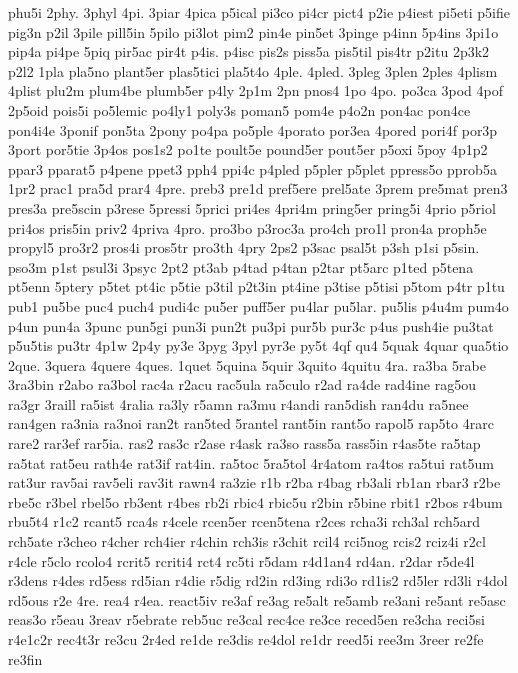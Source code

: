 {phu5i
2phy.
3phyl
4pi.
3piar
4pica
p5ical
pi3co
pi4cr
pict4
p2ie
p4iest
pi5eti
p5ifie
pig3n
p2il
3pile
pill5in
5pilo
pi3lot
pim2
pin4e
pin5et
3pinge
p4inn
5p4ins
3pi1o
pip4a
pi4pe
5piq
pir5ac
pir4t
p4is.
p4isc
pis2s
piss5a
pis5til
pis4tr
p2itu
2p3k2
p2l2
1pla
pla5no
plant5er
plas5tici
pla5t4o
4ple.
4pled.
3pleg
3plen
2ples
4plism
4plist
plu2m
plum4be
plumb5er
p4ly
2p1m
2pn
pnos4
1po
4po.
po3ca
3pod
4pof
2p5oid
pois5i
po5lemic
po4ly1
poly3s
poman5
pom4e
p4o2n
pon4ac
pon4ce
pon4i4e
3ponif
pon5ta
2pony
po4pa
po5ple
4porato
por3ea
4pored
pori4f
por3p
3port
por5tie
3p4os
pos1s2
po1te
poult5e
pound5er
pout5er
p5oxi
5poy
4p1p2
ppar3
pparat5
p4pene
ppet3
pph4
ppi4c
p4pled
p5pler
p5plet
ppress5o
pprob5a
1pr2
prac1
pra5d
prar4
4pre.
preb3
pre1d
pref5ere
prel5ate
3prem
pre5mat
pren3
pres3a
pre5scin
p3rese
5pressi
5prici
pri4es
4pri4m
pring5er
pring5i
4prio
p5riol
pri4os
pris5in
priv2
4priva
4pro.
pro3bo
p3roc3a
pro4ch
pro1l
pron4a
proph5e
propyl5
pro3r2
pros4i
pros5tr
pro3th
4pry
2ps2
p3sac
psal5t
p3sh
p1si
p5sin.
pso3m
p1st
psul3i
3psyc
2pt2
pt3ab
p4tad
p4tan
p2tar
pt5arc
p1ted
p5tena
pt5enn
5ptery
p5tet
pt4ic
p5tie
p3til
p2t3in
pt4ine
p3tise
p5tisi
p5tom
p4tr
p1tu
pub1
pu5be
puc4
puch4
pudi4c
pu5er
puff5er
pu4lar
pu5lar.
pu5lis
p4u4m
pum4o
p4un
pun4a
3punc
pun5gi
pun3i
pun2t
pu3pi
pur5b
pur3c
p4us
push4ie
pu3tat
p5u5tis
pu3tr
4p1w
2p4y
py3e
3pyg
3pyl
pyr3e
py5t
4qf
qu4
5quak
4quar
qua5tio
2que.
3quera
4quere
4ques.
1quet
5quina
5quir
3quito
4quitu
4ra.
ra3ba
5rabe
3ra3bin
r2abo
ra3bol
rac4a
r2acu
rac5ula
ra5culo
r2ad
ra4de
rad4ine
rag5ou
ra3gr
3raill
ra5ist
4ralia
ra3ly
r5amn
ra3mu
r4andi
ran5dish
ran4du
ra5nee
ran4gen
ra3nia
ra3noi
ran2t
ran5ted
5rantel
rant5in
rant5o
rapol5
rap5to
4rarc
rare2
rar3ef
rar5ia.
ras2
ras3c
r2ase
r4ask
ra3so
rass5a
rass5in
r4as5te
ra5tap
ra5tat
rat5eu
rath4e
rat3if
rat4in.
ra5toc
5ra5tol
4r4atom
ra4tos
ra5tui
rat5um
rat3ur
rav5ai
rav5eli
rav3it
rawn4
ra3zie
r1b
r2ba
r4bag
rb3ali
rb1an
rbar3
r2be
rbe5c
r3bel
rbel5o
rb3ent
r4bes
rb2i
rbic4
rbic5u
r2bin
r5bine
rbit1
r2bos
r4bum
rbu5t4
r1c2
rcant5
rca4s
r4cele
rcen5er
rcen5tena
r2ces
rcha3i
rch3al
rch5ard
rch5ate
r3cheo
r4cher
rch4ier
r4chin
rch3is
r3chit
rcil4
rci5nog
rcis2
rciz4i
r2cl
r4cle
r5clo
rcolo4
rcrit5
rcriti4
rct4
rc5ti
r5dam
r4d1an4
rd4an.
r2dar
r5de4l
r3dens
r4des
rd5ess
rd5ian
r4die
r5dig
rd2in
rd3ing
rdi3o
rd1is2
rd5ler
rd3li
r4dol
rd5ous
r2e
4re.
rea4
r4ea.
react5iv
re3af
re3ag
re5alt
re5amb
re3ani
re5ant
re5asc
reas3o
r5eau
3reav
r5ebrate
reb5uc
re3cal
rec4ce
re3ce
reced5en
re3cha
reci5si
r4e1c2r
rec4t3r
re3cu
2r4ed
re1de
re3dis
re4dol
re1dr
reed5i
ree3m
3reer
re2fe
re3fin
}
